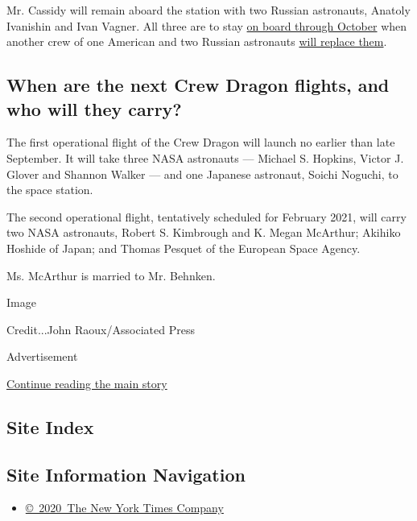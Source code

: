 Mr. Cassidy will remain aboard the station with two Russian astronauts,
Anatoly Ivanishin and Ivan Vagner. All three are to stay
\href{https://www.nasa.gov/sites/default/files/atoms/files/exp-63-summary.pdf}{on
board through October} when another crew of one American and two Russian
astronauts
\href{https://www.nasa.gov/press-release/nasa-astronaut-kate-rubins-crewmates-to-discuss-upcoming-spaceflight}{will
replace them}.

\hypertarget{when-are-the-next-crew-dragon-flights-and-who-will-they-carry}{%
\subsection{When are the next Crew Dragon flights, and who will they
carry?}\label{when-are-the-next-crew-dragon-flights-and-who-will-they-carry}}

The first operational flight of the Crew Dragon will launch no earlier
than late September. It will take three NASA astronauts --- Michael S.
Hopkins, Victor J. Glover and Shannon Walker --- and one Japanese
astronaut, Soichi Noguchi, to the space station.

The second operational flight, tentatively scheduled for February 2021,
will carry two NASA astronauts, Robert S. Kimbrough and K. Megan
McArthur; Akihiko Hoshide of Japan; and Thomas Pesquet of the European
Space Agency.

Ms. McArthur is married to Mr. Behnken.

Image

Credit...John Raoux/Associated Press

Advertisement

\protect\hyperlink{after-bottom}{Continue reading the main story}

\hypertarget{site-index}{%
\subsection{Site Index}\label{site-index}}

\hypertarget{site-information-navigation}{%
\subsection{Site Information
Navigation}\label{site-information-navigation}}

\begin{itemize}
\tightlist
\item
  \href{https://help.nytimes3xbfgragh.onion/hc/en-us/articles/115014792127-Copyright-notice}{©~2020~The
  New York Times Company}
\end{itemize}


